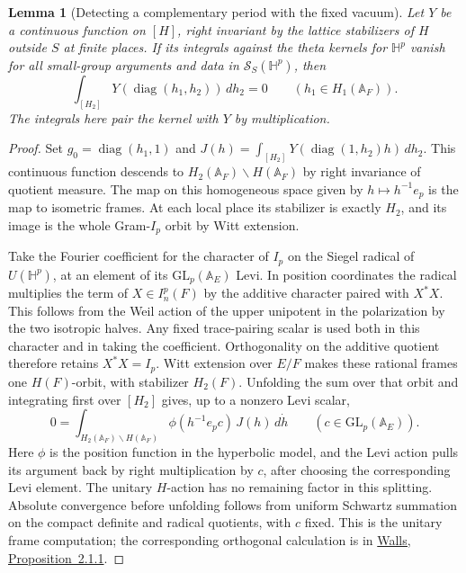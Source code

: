 \documentclass[a4paper,11pt]{article}
\newtheorem{lemma}[proposition]{Lemma}
\theoremstyle{definition}
\theoremstyle{remark}
\numberwithin{equation}{section}
\begin{document}
\begin{lemma}[Detecting a complementary period with the fixed vacuum]
\leavevmode\label{lem:frameperiod850}
Let \(Y\) be a continuous function on \([H]\), right invariant
by the lattice stabilizers of \(H\) outside \(S\) at finite
places. If its integrals against the theta kernels for
\(\mathbb H^p\) vanish for all small-group arguments and data
in \(\mathcal S_S(\mathbb H^p)\), then
\[
          \int_{[H_2]}Y(\operatorname{diag}(h_1,h_2))\,dh_2=0
                   \qquad(h_1\in H_1(\mathbb A_F)).
\]
The integrals here pair the kernel with \(Y\) by multiplication.
\end{lemma}
\begin{proof}
Set \(g_0=\operatorname{diag}(h_1,1)\) and
\(J(h)=\int_{[H_2]}Y(\operatorname{diag}(1,h_2)h)\,dh_2\).
This continuous function descends to
\(H_2(\mathbb A_F)\backslash H(\mathbb A_F)\) by right
invariance of quotient measure. The map on this homogeneous
space given by \(h\mapsto h^{-1}e_p\) is the map to isometric
frames. At each local place its stabilizer is exactly \(H_2\),
and its image is the whole Gram-\(I_p\) orbit by Witt extension.

Take the Fourier coefficient for the character of \(I_p\) on
the Siegel radical of \(U(\mathbb H^p)\), at an element of
its \(\mathrm{GL}_p(\mathbb A_E)\) Levi. In position coordinates
the radical multiplies the term of \(X\in I_n^p(F)\) by the
additive character paired with \(X^*X\). This follows from
the Weil action of the upper unipotent in the polarization
by the two isotropic halves. Any fixed trace-pairing scalar
is used both in this character and in taking the coefficient.
Orthogonality on the additive quotient therefore retains
\(X^*X=I_p\). Witt extension over \(E/F\) makes these rational
frames one \(H(F)\)-orbit, with stabilizer \(H_2(F)\).
Unfolding the sum over that orbit and integrating first over
\([H_2]\) gives, up to a nonzero Levi scalar,
\[
       0=\int_{H_2(\mathbb A_F)\backslash H(\mathbb A_F)}
                         \phi(h^{-1}e_p c)\,J(h)\,d\dot h
             \qquad (c\in\mathrm{GL}_p(\mathbb A_E)).
\]
Here \(\phi\) is the position function in the hyperbolic model,
and the Levi action pulls its argument back by right multiplication
by \(c\), after choosing the corresponding Levi element. The
unitary \(H\)-action has no remaining factor in this splitting.
Absolute convergence before unfolding follows from uniform
Schwartz summation on the compact definite and radical quotients,
with \(c\) fixed. This is the unitary frame computation;
the corresponding orthogonal calculation is in
\href{https://arxiv.org/pdf/1501.01565}{Walls, Proposition~2.1.1}.


\end{proof}
\end{document}
